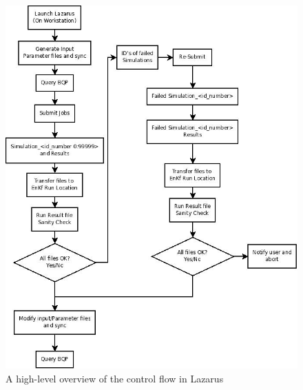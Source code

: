 \documentclass[conference,final]{IEEEtran}
\begin{document}
\begin{figure}
\begin{center}
\includegraphics[scale=0.35]{./figures/Diagram1.jpeg}
\end{center}
\caption{A high-level
  overview of the control flow in Lazarus}
\label{fig:controlflow}
\end{figure}

\end{document}
